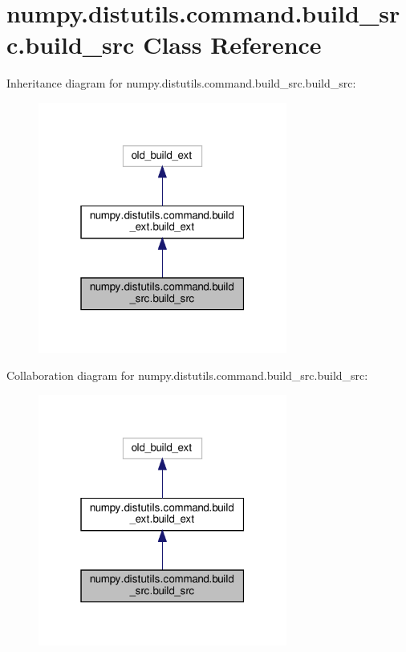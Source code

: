 \hypertarget{classnumpy_1_1distutils_1_1command_1_1build__src_1_1build__src}{}\section{numpy.\+distutils.\+command.\+build\+\_\+src.\+build\+\_\+src Class Reference}
\label{classnumpy_1_1distutils_1_1command_1_1build__src_1_1build__src}


Inheritance diagram for numpy.\+distutils.\+command.\+build\+\_\+src.\+build\+\_\+src\+:
\nopagebreak
\begin{figure}[H]
\begin{center}
\leavevmode
\includegraphics[width=232pt]{classnumpy_1_1distutils_1_1command_1_1build__src_1_1build__src__inherit__graph}
\end{center}
\end{figure}


Collaboration diagram for numpy.\+distutils.\+command.\+build\+\_\+src.\+build\+\_\+src\+:
\nopagebreak
\begin{figure}[H]
\begin{center}
\leavevmode
\includegraphics[width=232pt]{classnumpy_1_1distutils_1_1command_1_1build__src_1_1build__src__coll__graph}
\end{center}
\end{figure}
